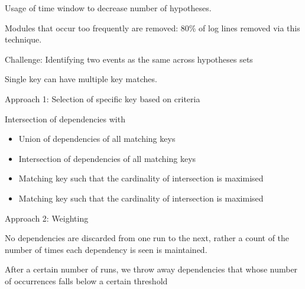 Usage of time window to decrease number of hypotheses. 

Modules that occur too frequently are removed: 80\% of log lines removed via this technique. 

Challenge: Identifying two events as the same across hypotheses sets

Single key can have multiple key matches.

Approach 1: Selection of specific key based on criteria

Intersection of dependencies with 
\begin{itemize}
\item Union of dependencies of all matching keys
\item Intersection of dependencies of all matching keys
\item Matching key such that the cardinality of intersection is maximised
\item Matching key such that the cardinality of intersection is maximised
\end{itemize}

Approach 2: Weighting

No dependencies are discarded from one run to the next, rather a count of the number of times each dependency is seen is maintained. 

After a certain number of runs, we throw away dependencies that whose number of occurrences falls below a certain threshold

